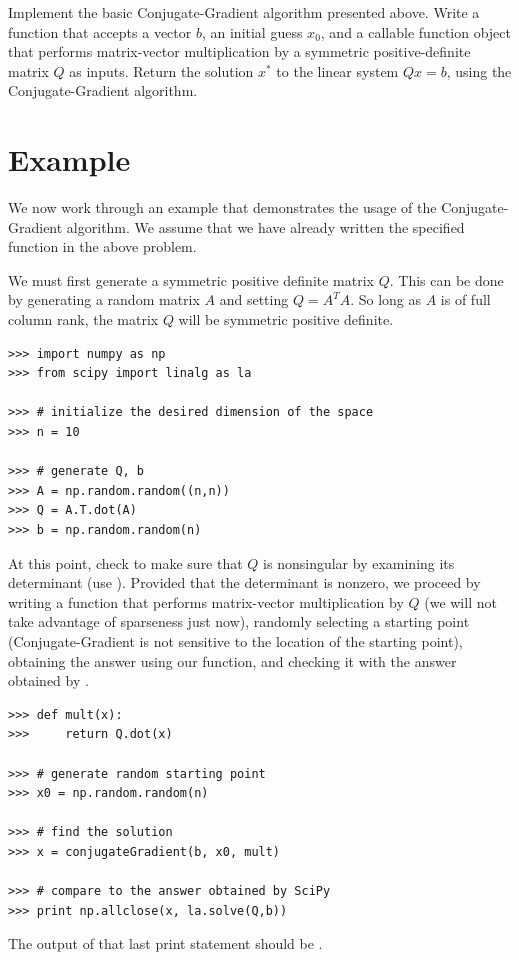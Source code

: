 \begin{problem}
Implement the basic Conjugate-Gradient algorithm presented above. Write a function  that accepts a vector $b$, an initial
guess $x_0$, and a callable function
object that performs matrix-vector multiplication by a symmetric positive-definite matrix $Q$ as inputs.
Return the solution $x^*$ to the linear system $Qx = b$, using the Conjugate-Gradient algorithm.
\end{problem}

\section*{Example}
We now work through an example that demonstrates the usage of the Conjugate-Gradient algorithm. We assume that we have already written 
the specified function in the above problem.

We must first generate a symmetric positive definite matrix $Q$. This can be done by generating a random matrix $A$ and setting $Q = A^TA$.
So long as $A$ is of full column rank, the matrix $Q$ will be symmetric positive definite.
\begin{lstlisting}
>>> import numpy as np
>>> from scipy import linalg as la

>>> # initialize the desired dimension of the space
>>> n = 10

>>> # generate Q, b
>>> A = np.random.random((n,n))
>>> Q = A.T.dot(A)
>>> b = np.random.random(n)
\end{lstlisting}
At this point, check to make sure that $Q$ is nonsingular by examining its determinant (use ).
Provided that the determinant is nonzero, we proceed by writing a function that performs matrix-vector multiplication by $Q$ (we
will not take advantage of sparseness just now), randomly selecting a starting point (Conjugate-Gradient is not sensitive to the location of
the starting point), obtaining the answer using our function, and checking it with the answer obtained by .
\begin{lstlisting}
>>> def mult(x):
>>>     return Q.dot(x)

>>> # generate random starting point
>>> x0 = np.random.random(n)

>>> # find the solution
>>> x = conjugateGradient(b, x0, mult)

>>> # compare to the answer obtained by SciPy
>>> print np.allclose(x, la.solve(Q,b))
\end{lstlisting}
The output of that last print statement should be .

